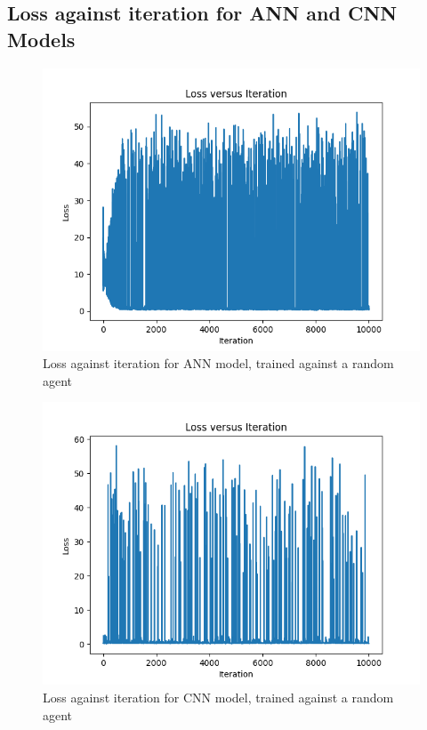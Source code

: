 \documentclass[a4paper,12pt,table]{article}
\begin{document}
\subsection{Loss against iteration for ANN and CNN Models}
\begin{figure}[H]
    \begin{center}
        \includegraphics[scale=0.65]{Pure_ANN.png}
        \caption{Loss against iteration for ANN model, trained against a random agent}
        \label{fig:}
    \end{center}
\end{figure}

\begin{figure}[H]
    \begin{center}
        \includegraphics[scale=0.6]{Pure_CNN.png}
        \caption{Loss against iteration for CNN model, trained against a random agent}
        \label{fig:}
    \end{center}
\end{figure}
\end{document}
